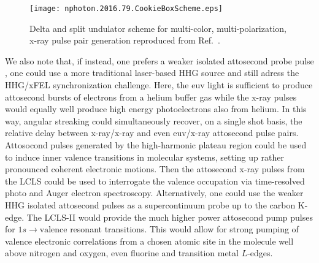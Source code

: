 \begin{figure}[b]
\centerline{\texttt{[image: nphoton.2016.79.CookieBoxScheme.eps]}}
\caption{\label{fig::2color2polScheme} Delta and split undulator scheme for multi-color, multi-polarization, x-ray pulse pair generation reproduced from Ref.~\cite{Lutman2016}. }
\end{figure}

We also note that, if instead, one prefers a weaker isolated attosecond probe pulse \cite{Chen2014,Schmidt2016,Biegert2016,WornerSci2017}, one could use a more traditional laser-based HHG source and still adress the HHG/xFEL synchronization challenge.
Here, the euv light is sufficient to produce attosecond bursts of electrons from a helium buffer gas while the x-ray pulses would equally well produce high energy photoelectrons also from helium.
In this way, angular streaking could simultaneously recover, on a single shot basis, the relative delay between x-ray/x-ray and even euv/x-ray attosecond pulse pairs.
Attosocond pulses generated by the high-harmonic plateau region \cite{attoclock2008,Kulander2011} could be used to induce inner valence transitions in molecular systems, setting up rather pronounced coherent electronic motions.
Then the attosecond x-ray pulses from the LCLS could be used to interrogate the valence occupation via time-resolved photo and Auger electron spectroscopy.
Alternatively, one could use the weaker HHG isolated attosecond pulses \cite{Biegert2016} as a supercontinuum probe up to the carbon K-edge.
The LCLS-II would provide the much higher power attosecond pump pulses for $1s\rightarrow\mbox{valence}$ resonant transitions.
This would allow for strong pumping of valence electronic correlations from a chosen atomic site in the molecule well above nitrogen and oxygen, even fluorine and transition metal $L$-edges.

